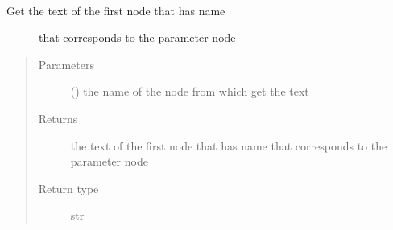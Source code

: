\documentclass[a4paper,10pt,english]{sphinxmanual}
\begin{document}
\begin{fulllineitems}
\begin{fulllineitems}
\end{fulllineitems}


\begin{fulllineitems}
\label{\detokenize{commands/apidoc/src:src.xmlManager.ReadXmlFile.get_node_text}}~\begin{description}
\item[{Get the text of the first node that has name }] \leavevmode
that corresponds to the parameter node

\end{description}
\begin{quote}\begin{description}
\item[{Parameters}] \leavevmode
{} () \textendash{} the name of the node from which get the text

\item[{Returns}] \leavevmode
the text of the first node that has name 
that corresponds to the parameter node

\item[{Return type}] \leavevmode
str

\end{description}\end{quote}

\end{fulllineitems}


\end{fulllineitems}

\end{document}
